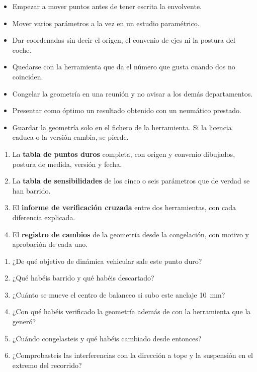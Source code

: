 \begin{ojo}
\begin{itemize}
  \item Empezar a mover puntos antes de tener escrita la envolvente.
  \item Mover varios parámetros a la vez en un estudio paramétrico.
  \item Dar coordenadas sin decir el origen, el convenio de ejes ni la postura
        del coche.
  \item Quedarse con la herramienta que da el número que gusta cuando dos no
        coinciden.
  \item Congelar la geometría en una reunión y no avisar a los demás
        departamentos.
  \item Presentar como óptimo un resultado obtenido con un neumático prestado.
  \item Guardar la geometría solo en el fichero de la herramienta. Si la
        licencia caduca o la versión cambia, se pierde.
\end{itemize}
\end{ojo}

\begin{entregable}
\begin{enumerate}
  \item La \textbf{tabla de puntos duros} completa, con origen y convenio
        dibujados, postura de medida, versión y fecha.
  \item La \textbf{tabla de sensibilidades} de los cinco o seis parámetros que
        de verdad se han barrido.
  \item El \textbf{informe de verificación cruzada} entre dos herramientas, con
        cada diferencia explicada.
  \item El \textbf{registro de cambios} de la geometría desde la congelación,
        con motivo y aprobación de cada uno.
\end{enumerate}
\end{entregable}

\begin{juez}
\begin{enumerate}
  \item ¿De qué objetivo de dinámica vehicular sale este punto duro?
  \item ¿Qué habéis barrido y qué habéis descartado?
  \item ¿Cuánto se mueve el centro de balanceo si subo este anclaje
        \SI{10}{\milli\meter}?
  \item ¿Con qué habéis verificado la geometría además de con la herramienta
        que la generó?
  \item ¿Cuándo congelasteis y qué habéis cambiado desde entonces?
  \item ¿Comprobasteis las interferencias con la dirección a tope y la
        suspensión en el extremo del recorrido?
\end{enumerate}
\end{juez}
